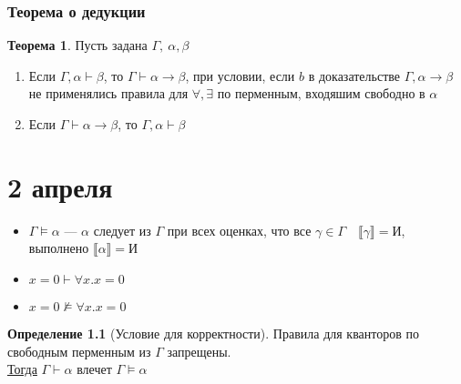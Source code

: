 \documentclass[oneside]{book}
\theoremstyle{plain}
\theoremstyle{remark}
\theoremstyle{definition}
\newtheorem{theorem}{Теорема}[section]
\newtheorem*{definition}{Определение}
\begin{document}
\subsection{Теорема о дедукции}
\label{sec:orgbbf32df}
\begin{theorem}
Пусть задана \(\Gamma,\ \alpha,\beta\)
\begin{enumerate}
\item Если \(\Gamma, \alpha \vdash \beta\), то \(\Gamma \vdash \alpha \to \beta\), при условии, если \(b\) в доказательстве \(\Gamma, \alpha \to \beta\) не применялись правила для \(\forall, \exists\) по перменным, входяшим свободно в \(\alpha\)
\item Если \(\Gamma \vdash \alpha \to \beta\), то \(\Gamma, \alpha \vdash \beta\)
\end{enumerate}
\end{theorem}
\chapter{2 апреля}
\label{sec:orgb2866ee}
\begin{itemize}
\item \(\Gamma \vDash \alpha\) --- \(\alpha\) следует из \(\Gamma\) при всех оценках, что все \(\gamma \in \Gamma\quad \llbracket \gamma \rrbracket = \text{И}\), выполнено \(\llbracket \alpha \rrbracket = \text{И}\)
\item \(x = 0 \vdash \forall x. x = 0\)
\item \(x = 0 \not\vDash \forall x. x = 0\)
\end{itemize}
\begin{definition}[Условие для корректности]
Правила для кванторов по свободным перменным из \(\Gamma\) запрещены. \\
\uline{Тогда} \(\Gamma \vdash \alpha\) влечет \(\Gamma \vDash \alpha\)
\end{definition}
\end{document}
